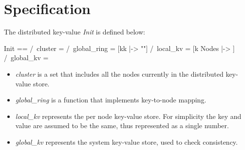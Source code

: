 


\section{Specification}

The distributed key-value \textit{Init} is defined below:\\

\begin{tla}
Init ==
    /\ cluster = {}
    /\ global_ring = [kk \in {} |-> ""]
    /\ local_kv = [k \in Nodes |-> {}]
    /\ global_kv = {}
\end{tla}
\begin{tlatex}
%
%
%
\end{tlatex}

\begin{itemize}
    \item \textit{cluster} is a set that includes all the nodes currently in the distributed key-value store.
    \item \textit{global\_ring} is a function that implements key-to-node mapping.
    \item \textit{local\_kv} represents the per node key-value store. For
    simplicity the key and value are assumed to be the same, thus represented
    as a single number.
    \item \textit{global\_kv} represents the system key-value store, used to check consistency.
\end{itemize}

